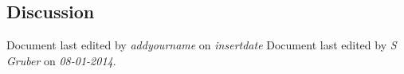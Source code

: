 \begin{landscape}
\providecommand{\tabularnewline}{\\}

\newenvironment{longtab}
{
\begin{longtable}
{|>{\raggedright}p{4cm}
 |>{\raggedright}p{1.5cm}
 |>{\raggedright}p{1.5cm}
 |>{\raggedright}p{1cm}
 |>{\raggedright}p{8cm}
 |>{\raggedright}p{4cm}|}
\hline
Parameter& Type& Default& Unit& Description & Scope
\tabularnewline
\hline
\endhead
}
{
\hline
\end{longtable}
}


\newenvironment{changeitem}[3]
{
 \rule[-1em]{0.2ex}{4em}\hspace*{1em}%
 \begin{minipage}{9.95\textwidth}
 \begin{tabbing}
 \hspace*{3cm} \= ~ \kill
 \textcolor{red}{\emph{Change:}}         \> \textbf{#1} \\
 \textcolor{red}{\emph{Date of Change:}} \> \textbf{#2} \\
 \textcolor{red}{\emph{Revision:}}       \> \textbf{#3} \\
 \end{tabbing}
 \end{minipage}
}{\vspace*{1em}}



\newenvironment{note}{%
\begin{list}{}%
         {}%
         \item[\textbf{Note:} ] ~\\%
}{%
\end{list}
}





\end{landscape}
\newpage
\subsection*{Discussion}
Document last edited by \textit{addyourname} on \textit{insertdate}
Document last edited by \textit{S Gruber} on \textit{08-01-2014}.
